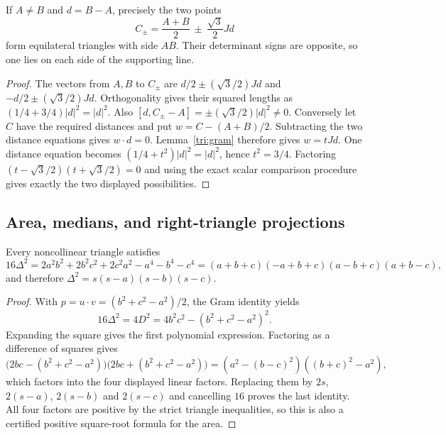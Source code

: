 \begin{theorem}
\label{tri:equilateral-construction}
If $A\ne B$ and $d=B-A$, precisely the two points
\[
 C_\pm=\frac{A+B}{2}\ \pm\ \frac{\sqrt3}{2}Jd
\]
form equilateral triangles with side $AB$.  Their determinant signs are
opposite, so one lies on each side of the supporting line.
\end{theorem}
\begin{proof}
The vectors from $A,B$ to $C_\pm$ are
$d/2\pm(\sqrt3/2)Jd$ and $-d/2\pm(\sqrt3/2)Jd$.
Orthogonality gives their squared lengths as
$(1/4+3/4)|d|^2=|d|^2$.
Also $[d,C_\pm-A]=\pm(\sqrt3/2)|d|^2\ne0$.
Conversely let $C$ have the required distances and put
$w=C-(A+B)/2$.  Subtracting the two distance equations gives
$w\mathbin{\cdot}d=0$.  Lemma~\ref{tri:gram} therefore gives $w=tJd$.
One distance equation becomes $(1/4+t^2)|d|^2=|d|^2$, hence
$t^2=3/4$.  Factoring
$(t-\sqrt3/2)(t+\sqrt3/2)=0$ and using the exact scalar comparison
procedure gives exactly the two displayed possibilities.
\end{proof}

\subsection{Area, medians, and right-triangle projections}

\begin{theorem}
\label{tri:heron}
Every noncollinear triangle satisfies
\[
 16\Delta^2=2a^2b^2+2b^2c^2+2c^2a^2-a^4-b^4-c^4
           =(a+b+c)(-a+b+c)(a-b+c)(a+b-c),
\]
and therefore $\Delta^2=s(s-a)(s-b)(s-c)$.
\end{theorem}
\begin{proof}
With $p=u\mathbin{\cdot}v=(b^2+c^2-a^2)/2$, the Gram identity yields
\[
 16\Delta^2=4D^2=4b^2c^2-(b^2+c^2-a^2)^2.
\]
Expanding the square gives the first polynomial expression.  Factoring
as a difference of squares gives
\[
 \bigl(2bc-(b^2+c^2-a^2)\bigr)
 \bigl(2bc+(b^2+c^2-a^2)\bigr)
 =(a^2-(b-c)^2)((b+c)^2-a^2),
\]
which factors into the four displayed linear factors.  Replacing them
by $2s$, $2(s-a)$, $2(s-b)$ and $2(s-c)$ and cancelling $16$ proves the
last identity.  All four factors are positive by the strict triangle
inequalities, so this is also a certified positive square-root formula
for the area.
\end{proof}

